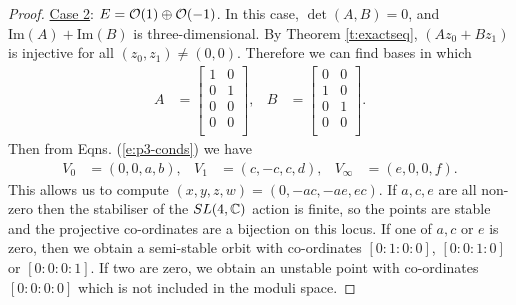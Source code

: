 \begin{proof}
		\underline{Case 2}: $E = \mathcal{O}(1)\oplus \mathcal{O}(-1)$. In this case, $\det(A,B)=0$, and $\text{Im}(A) + \text{Im}(B)$ is three-dimensional.  By Theorem \ref{t:exactseq}, $(Az_0+Bz_1)$ is injective for all $(z_0,z_1)\neq (0,0)$. Therefore we can find bases in which
		\begin{align*}
		A &= \begin{bmatrix}
		1 & 0\\
		0 & 1\\
		0 & 0\\
		0 & 0\\
		\end{bmatrix}, & 
		B &= \begin{bmatrix}
		0 & 0\\
		1 & 0\\
		0 & 1\\
		0 & 0\\
		\end{bmatrix}.
		\end{align*}
		Then from Eqns. (\ref{e:p3-conds}) we have
		\begin{align}
			V_0 &= (0,0,a,b), & V_1 &= (c,-c,c,d), & V_\infty&= (e,0,0,f).
		\end{align}
		This allows us to compute $(x,y,z,w) = (0,-ac,-ae,ec)$. If $a,c,e$ are all non-zero then the stabiliser of the $SL(4,\mathbb{C})$ action is finite, so the points are stable and the projective co-ordinates are a bijection on this locus. If one of $a,c$ or $e$ is zero, then we obtain a semi-stable orbit with co-ordinates $[0:1:0:0]$, $[0:0:1:0]$ or $[0:0:0:1]$. If two are zero, we obtain an unstable point with co-ordinates $[0:0:0:0]$ which is not included in the moduli space.
		

\end{proof}
